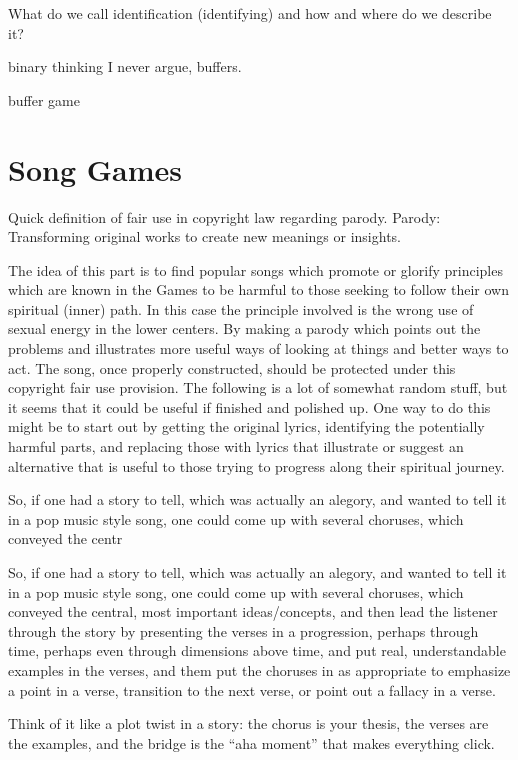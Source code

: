 \documentclass[12pt,letterpaper]{book}
\begin{document}
What do we call identification (identifying) and how and where do we describe it?

binary thinking I never argue, buffers.

buffer game

\section{Song Games}

Quick definition of fair use in copyright law regarding parody.
Parody: Transforming original works to create new meanings or insights.

The idea of this part is to find popular songs which promote or glorify principles which are known in the Games to be harmful to those seeking to follow their own spiritual (inner) path. In this case the principle involved is the wrong use of sexual energy in the lower centers. By making a parody which points out the problems and illustrates more useful ways of looking at things and better ways to act. The song, once properly constructed, should be protected under this copyright fair use provision. The following is a lot of somewhat random stuff, but it seems that it could be useful if finished and polished up. One way to do this might be to start out by getting the original lyrics, identifying the potentially harmful parts, and replacing those with lyrics that illustrate or suggest an alternative that is useful to those trying to progress along their spiritual journey.

So, if one had a story to tell, which was actually an alegory, and wanted to tell it in a  pop music style song, one could come up with several choruses, which conveyed the centr

So, if one had a story to tell, which was actually an alegory, and wanted to tell it in a  pop music style song, one could come up with several choruses, which conveyed the central, most important ideas/concepts, and then lead the listener through the story by presenting the verses in a progression, perhaps through time, perhaps even through dimensions above time, and put real, understandable examples in the verses, and them put the choruses in as appropriate to emphasize a point in a verse, transition to the next verse, or point out a fallacy in a verse.

    Think of it like a plot twist in a story: the chorus is your thesis, the verses are the examples, and the bridge is the “aha moment” that makes everything click.
    
\end{document}
